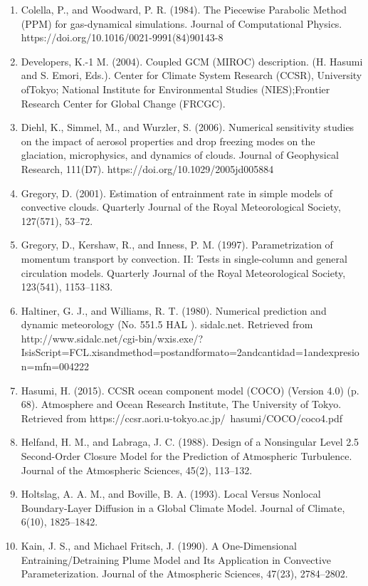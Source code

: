 \begin{enumerate}
\item Colella, P., and Woodward, P. R. (1984). The Piecewise Parabolic Method (PPM) for gas-dynamical simulations. Journal of Computational Physics. https://doi.org/10.1016/0021-9991(84)90143-8
\item Developers, K.-1 M. (2004). Coupled GCM (MIROC) description. (H. Hasumi and S. Emori, Eds.). Center for Climate System Research (CCSR), University ofTokyo; National Institute for Environmental Studies (NIES);Frontier Research Center for Global Change (FRCGC).
\item Diehl, K., Simmel, M., and Wurzler, S. (2006). Numerical sensitivity studies on the impact of aerosol properties and drop freezing modes on the glaciation, microphysics, and dynamics of clouds. Journal of Geophysical Research, 111(D7). https://doi.org/10.1029/2005jd005884
\item Gregory, D. (2001). Estimation of entrainment rate in simple models of convective clouds. Quarterly Journal of the Royal Meteorological Society, 127(571), 53–72.
\item Gregory, D., Kershaw, R., and Inness, P. M. (1997). Parametrization of momentum transport by convection. II: Tests in single-column and general circulation models. Quarterly Journal of the Royal Meteorological Society, 123(541), 1153–1183.
\item Haltiner, G. J., and Williams, R. T. (1980). Numerical prediction and dynamic meteorology (No. 551.5 HAL ). sidalc.net. Retrieved from http://www.sidalc.net/cgi-bin/wxis.exe/?IsisScript=FCL.xisandmethod=postandformato=2andcantidad=1andexpresion=mfn=004222
\item Hasumi, H. (2015). CCSR ocean component model (COCO) (Version 4.0) (p. 68). Atmosphere and Ocean Research Institute, The University of Tokyo. Retrieved from https://ccsr.aori.u-tokyo.ac.jp/~hasumi/COCO/coco4.pdf
\item Helfand, H. M., and Labraga, J. C. (1988). Design of a Nonsingular Level 2.5 Second-Order Closure Model for the Prediction of Atmospheric Turbulence. Journal of the Atmospheric Sciences, 45(2), 113–132.
\item Holtslag, A. A. M., and Boville, B. A. (1993). Local Versus Nonlocal Boundary-Layer Diffusion in a Global Climate Model. Journal of Climate, 6(10), 1825–1842.
\item Kain, J. S., and Michael Fritsch, J. (1990). A One-Dimensional Entraining/Detraining Plume Model and Its Application in Convective Parameterization. Journal of the Atmospheric Sciences, 47(23), 2784–2802.

\end{enumerate}
